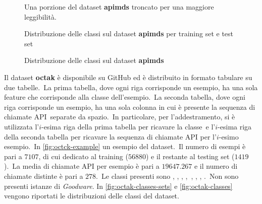 \begin{figure}[h!]
    \centering
    \inputminted[fontsize=\small]{text}{validazione-empirica/files/apimds-example.csv}
    \caption{Una porzione del dataset \textbf{apimds} troncato per una maggiore leggibilità.}
    \label{fig:apimds-example}
\end{figure}

\begin{figure}[h!]
    \centering
    \caption{Distribuzione delle classi sul dataset \textbf{apimds} per training set e test set}
    \label{fig:apimds-classes-sets}
\end{figure}


\begin{figure}[h!]
    \centering
    \caption{Distribuzione delle classi sul dataset \textbf{apimds}}
    \label{fig:apimds-classes}
\end{figure}

\FloatBarrier


Il dataset \textbf{octak} è disponibile su GitHub ed è distribuito in formato tabulare su due tabelle.\
La prima tabella, dove ogni riga corrisponde un esempio, ha una sola feature che corrisponde alla classe dell'esempio.\
La seconda tabella, dove ogni riga corrisponde un esempio, ha una sola colonna in cui è presente la sequenza di chiamate API\
separate da spazio.\
In particolare, per l'addestramento, si è utilizzata l'$i$-esima riga della prima tabella per ricavare la classe\
e l'$i$-esima riga della seconda tabella per ricavare la sequenza di chiamate API per l'$i$-esimo esempio.\
In \autoref{fig:octck-example} un esempio del dataset.\
Il numero di esempi è pari a $7107$, di cui  dedicato al training ($56880$) e il restante  al testing set ($1419$).\
La media di chiamate API per esempio è pari a $19647.267$ e il numero di chiamate distinte è pari a $278$.\
Le classi presenti sono , , , ,\
, , , .\
Non sono presenti istanze di \textit{Goodware}.
In \autoref{fig:octak-classes-sets} e \autoref{fig:octak-classes} vengono riportati le distribuzioni delle classi del dataset.


